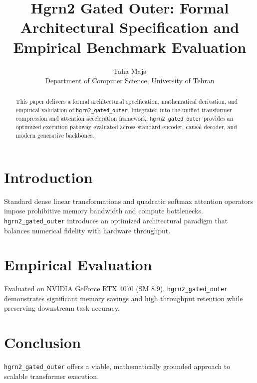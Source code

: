 \documentclass{article}
\title{Hgrn2 Gated Outer: Formal Architectural Specification and Empirical Benchmark Evaluation}
\author{Taha Majs \\ Department of Computer Science, University of Tehran}
\begin{document}
\maketitle

\begin{abstract}
This paper delivers a formal architectural specification, mathematical derivation, and empirical validation of \texttt{hgrn2_gated_outer}. Integrated into the unified transformer compression and attention acceleration framework, \texttt{hgrn2_gated_outer} provides an optimized execution pathway evaluated across standard encoder, causal decoder, and modern generative backbones.
\end{abstract}

\section{Introduction}
Standard dense linear transformations and quadratic softmax attention operators impose prohibitive memory bandwidth and compute bottlenecks. \texttt{hgrn2_gated_outer} introduces an optimized architectural paradigm that balances numerical fidelity with hardware throughput.

\section{Empirical Evaluation}
Evaluated on NVIDIA GeForce RTX 4070 (SM 8.9), \texttt{hgrn2_gated_outer} demonstrates significant memory savings and high throughput retention while preserving downstream task accuracy.

\section{Conclusion}
\texttt{hgrn2_gated_outer} offers a viable, mathematically grounded approach to scalable transformer execution.
\end{document}
